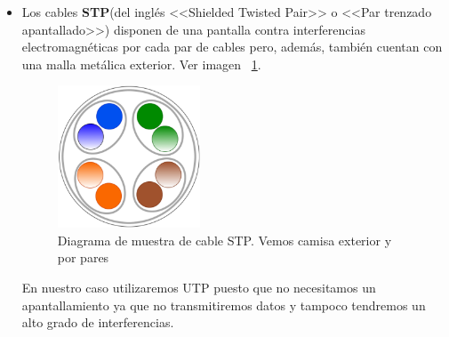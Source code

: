 \begin{itemize}
\item Los cables \textbf{STP}(del inglés <<Shielded Twisted Pair>> o <<Par trenzado apantallado>>) disponen de una pantalla contra interferencias electromagnéticas por cada par de cables pero, además, también cuentan con una malla metálica exterior. Ver imagen ~\ref{Img:Muestra STP}.
\begin{figure}
    \centering
    \includegraphics[width=0.4\textwidth]{img/STP.pdf}
    \caption[Diagrama de muestra de cable STP]{Diagrama de muestra de cable STP. Vemos camisa exterior y por pares} \label{Img:Muestra STP}
\end{figure}

En nuestro caso utilizaremos UTP puesto que no necesitamos un apantallamiento ya que no transmitiremos datos y tampoco tendremos un alto grado de interferencias.

\end{itemize}

